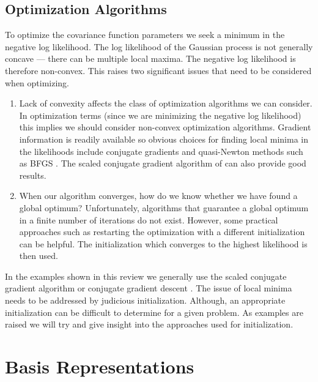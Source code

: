 \subsection{Optimization Algorithms}

To optimize the covariance function parameters we seek a minimum in
the negative log likelihood. The log likelihood of the Gaussian
process is not generally concave --- there can be multiple local
maxima. The negative log likelihood is therefore non-convex. This
raises two significant issues that need to be considered when
optimizing.

\begin{enumerate}
\item Lack of convexity affects the class of optimization algorithms
  we can consider.  In optimization terms (since we are minimizing the
  negative log likelihood) this implies we should consider non-convex
  optimization algorithms. Gradient information is readily available
  so obvious choices for finding local minima in the likelihoods
  include conjugate gradients and quasi-Newton methods such as BFGS
  \cite[e.g.][]{Zhu:lbfgsb97}. The scaled conjugate gradient algorithm of \cite{Moller:scg93} can also
  provide good results.

\item When our algorithm converges, how do we know whether we have
  found a global optimum? Unfortunately, algorithms that guarantee a
  global optimum in a finite number of iterations do not
  exist. However, some practical approaches such as restarting the
  optimization with a different initialization can be helpful. The
  initialization which converges to the highest likelihood is then
  used.
\end{enumerate}

In the examples shown in this review we generally use the scaled
conjugate gradient algorithm \cite{Moller:scg93} or conjugate gradient
descent \cite{Hestenes:conjugate52}. The issue of local minima needs to be addressed by
judicious initialization. Although, an appropriate initialization can
be difficult to determine for a given problem. As examples are raised
we will try and give insight into the approaches used for
initialization.

\section{Basis Representations}

